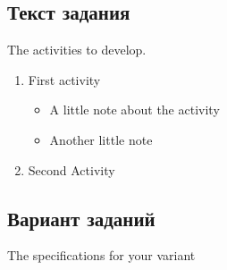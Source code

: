 \begin{center}	
    \section{Текст задания}
\end{center}
The activities to develop.
\begin{enumerate}
    \item First activity\cite{curtis}
    \begin{itemize}
        \item A little note about the activity
        \item Another little note\cite{web:lang:stats}
    \end{itemize}
    \item Second Activity
\end{enumerate}
\subsection{Вариант заданий}
The specifications for your variant
\newpage